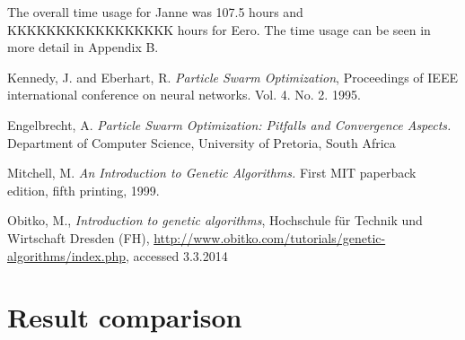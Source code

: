 \documentclass[twoside]{article}
\begin{document}
\begin{multicols}{2}
The overall time usage for Janne was 107.5 hours and KKKKKKKKKKKKKKKKK hours for Eero. The time usage can be seen in more detail in Appendix B.



\begin{thebibliography}{99} %
 Kennedy, J. and Eberhart, R.
  \emph{Particle Swarm Optimization},
 Proceedings of IEEE international conference on neural networks. Vol. 4. No. 2. 1995. 

 Engelbrecht, A. \emph{Particle Swarm Optimization: Pitfalls and Convergence Aspects.}
 Department of Computer Science, University of Pretoria, South Africa
 
Mitchell, M. \emph{An Introduction to Genetic Algorithms.} First MIT paperback edition, fifth printing, 1999. 
 
Obitko, M., \emph{Introduction to genetic algorithms}, Hochschule f\"ur Technik und Wirtschaft Dresden (FH), \url{http://www.obitko.com/tutorials/genetic-algorithms/index.php}, accessed 3.3.2014

\end{thebibliography}


\end{multicols}
\newpage
\appendix
\section{Result comparison}

\newpage
\end{document}
